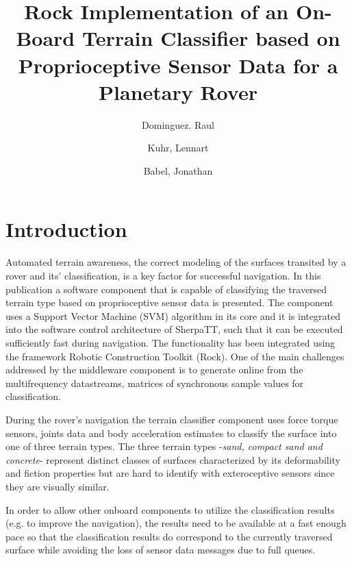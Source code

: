 \documentclass{article}
\title{Rock Implementation of an On-Board Terrain Classifier based on Proprioceptive Sensor Data for a Planetary Rover}
\author{
Dominguez. Raul \and Kuhr, Lennart \and Babel, Jonathan
}
\begin{document}
\maketitle



\section{Introduction}



Automated terrain awareness, the correct modeling of the surfaces transited by a rover and its’ classification, is a key factor for successful navigation. 
In this publication a software component that is capable of classifying the traversed terrain type based on proprioceptive sensor data is presented. 
The component uses a Support Vector Machine (SVM) algorithm in its core and it is integrated into the software control architecture of SherpaTT, such that it can be executed sufficiently fast during navigation. 
The functionality has been integrated using the framework Robotic Construction Toolkit (Rock).
One of the main challenges addressed by the middleware component is to generate online from the multifrequency datastreams, matrices of synchronous sample values for classification.

During the rover's navigation the terrain classifier component uses force torque sensors, joints data and body acceleration estimates to classify the surface into one of three terrain types.
The three terrain types -\emph{sand, compact sand and concrete}- represent distinct classes of surfaces characterized by its deformability and fiction properties but are hard to identify with exteroceptive sensors since they are visually similar.

In order to allow other onboard components to utilize the classification results (e.g. to improve the navigation), the results need to be available at a fast enough pace so that the classification results do correspond to the currently traversed surface while avoiding the loss of sensor data messages due to full queues.
\end{document}
